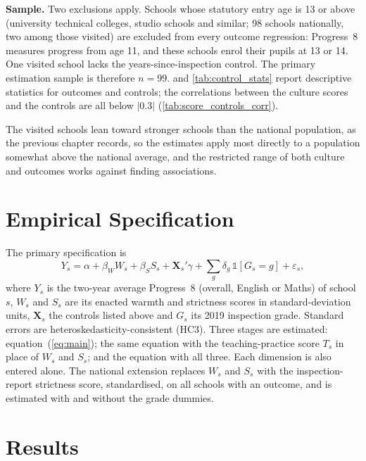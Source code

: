 \textbf{Sample.} Two exclusions apply. Schools whose statutory entry age is 13
or above (university technical colleges, studio schools and similar; 98
schools nationally, two among those visited) are excluded from every outcome
regression: Progress~8 measures progress from age 11, and these schools enrol
their pupils at 13 or 14. One visited school lacks the years-since-inspection
control. The primary estimation sample is therefore $n = 99$.
 and \cref{tab:control_stats} report descriptive
statistics for outcomes and controls; the correlations between the culture
scores and the controls are all below $|0.3|$ (\cref{tab:score_controls_corr}).

The visited schools lean toward stronger schools than the national
population, as the previous chapter records, so the estimates apply most
directly to a population somewhat above the national average, and the
restricted range of both culture and outcomes works against finding
associations.

\section{Empirical Specification}
\label{sec:p2_spec}

The primary specification is
%
\begin{equation}
  \label{eq:main}
  Y_s = \alpha + \beta_W W_s + \beta_S S_s + \mathbf{X}_s'\gamma
        + \sum_g \delta_g \,\mathbb{1}[G_s = g] + \varepsilon_s ,
\end{equation}
%
where $Y_s$ is the two-year average Progress~8 (overall, English or Maths) of
school $s$, $W_s$ and $S_s$ are its enacted warmth and strictness scores in
standard-deviation units, $\mathbf{X}_s$ the controls listed above and $G_s$
its 2019 inspection grade. Standard errors are heteroskedasticity-consistent
(HC3). Three stages are estimated: equation~(\ref{eq:main}); the same
equation with the teaching-practice score $T_s$ in place of $W_s$ and $S_s$;
and the equation with all three. Each dimension is also entered alone. The
national extension replaces $W_s$ and $S_s$ with the inspection-report
strictness score, standardised, on all schools with an outcome, and is
estimated with and without the grade dummies.

\section{Results}
\label{sec:p2_results}


